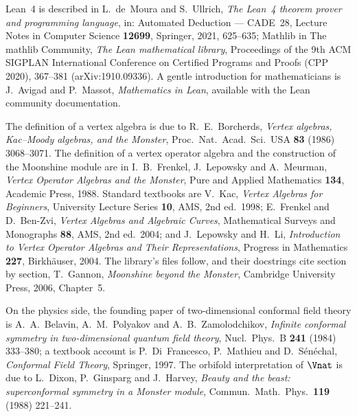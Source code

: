 Lean~4 is described in L.~de~Moura and S.~Ullrich, \emph{The Lean~4 theorem prover and programming
language}, in: Automated Deduction --- CADE~28, Lecture Notes in Computer Science \textbf{12699},
Springer, 2021, 625--635; Mathlib in The mathlib Community, \emph{The Lean mathematical library},
Proceedings of the 9th ACM SIGPLAN International Conference on Certified Programs and Proofs (CPP
2020), 367--381 (arXiv:1910.09336). A gentle introduction for mathematicians is J.~Avigad and
P.~Massot, \emph{Mathematics in Lean}, available with the Lean community documentation.

The definition of a vertex algebra is due to R.~E.~Borcherds, \emph{Vertex algebras, Kac--Moody
algebras, and the Monster}, Proc.\ Nat.\ Acad.\ Sci.\ USA \textbf{83} (1986) 3068--3071. The
definition of a vertex operator algebra and the construction of the Moonshine module are in
I.~B.~Frenkel, J.~Lepowsky and A.~Meurman, \emph{Vertex Operator Algebras and the Monster}, Pure and
Applied Mathematics \textbf{134}, Academic Press, 1988. Standard textbooks are V.~Kac, \emph{Vertex
Algebras for Beginners}, University Lecture Series \textbf{10}, AMS, 2nd ed.\ 1998; E.~Frenkel and
D.~Ben-Zvi, \emph{Vertex Algebras and Algebraic Curves}, Mathematical Surveys and Monographs
\textbf{88}, AMS, 2nd ed.\ 2004; and J.~Lepowsky and H.~Li, \emph{Introduction to Vertex Operator
Algebras and Their Representations}, Progress in Mathematics \textbf{227}, Birkh\"auser, 2004. The
library's files follow, and their docstrings cite section by section, T.~Gannon, \emph{Moonshine
beyond the Monster}, Cambridge University Press, 2006, Chapter~5.

On the physics side, the founding paper of two-dimensional conformal field theory is A.~A.~Belavin,
A.~M.~Polyakov and A.~B.~Zamolodchikov, \emph{Infinite conformal symmetry in two-dimensional quantum
field theory}, Nucl.\ Phys.\ B \textbf{241} (1984) 333--380; a textbook account is P.~Di~Francesco,
P.~Mathieu and D.~S\'en\'echal, \emph{Conformal Field Theory}, Springer, 1997. The orbifold
interpretation of $\Vnat$ is due to L.~Dixon, P.~Ginsparg and J.~Harvey, \emph{Beauty and the beast:
superconformal symmetry in a Monster module}, Commun.\ Math.\ Phys.\ \textbf{119} (1988) 221--241.

